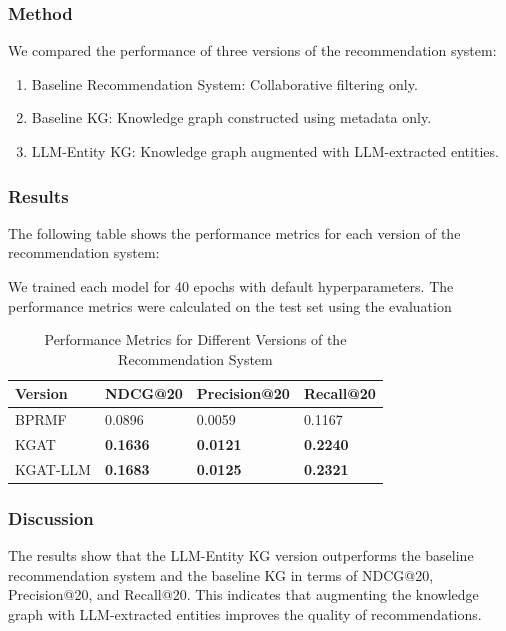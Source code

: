 \documentclass{article}
\begin{document}
\subsubsection{Method}
We compared the performance of three versions of the recommendation system:

\begin{enumerate}
      \item Baseline Recommendation System: Collaborative filtering only.
      \item Baseline KG: Knowledge graph constructed using metadata only.
      \item LLM-Entity KG: Knowledge graph augmented with LLM-extracted entities.
      
\end{enumerate}

\subsubsection{Results}
The following table shows the performance metrics for each version of the
recommendation system:

We trained each model for 40 epochs with default hyperparameters. The
performance metrics were calculated on the test set using the evaluation
\begin{table}[H]
      \centering
      \begin{tabular}{|l|l|l|l|}
            \hline
            \textbf{Version} & \textbf{NDCG@20} & \textbf{Precision@20} & \textbf{Recall@20} \\ \hline
            BPRMF & 0.0896 & 0.0059 & 0.1167 \\ \hline
            KGAT & \textbf{0.1636} & \textbf{0.0121} & \textbf{0.2240} \\ \hline
            KGAT-LLM & \textbf{0.1683} & \textbf{0.0125} & \textbf{0.2321} \\ \hline
      \end{tabular}
      \caption{Performance Metrics for Different Versions of the Recommendation System}
      \label{tab:results}
\end{table}


\subsubsection{Discussion}
The results show that the LLM-Entity KG version outperforms the baseline
recommendation system and the baseline KG in terms of NDCG@20, Precision@20,
and Recall@20. This indicates that augmenting the knowledge graph with
LLM-extracted entities improves the quality of recommendations.
\end{document}
